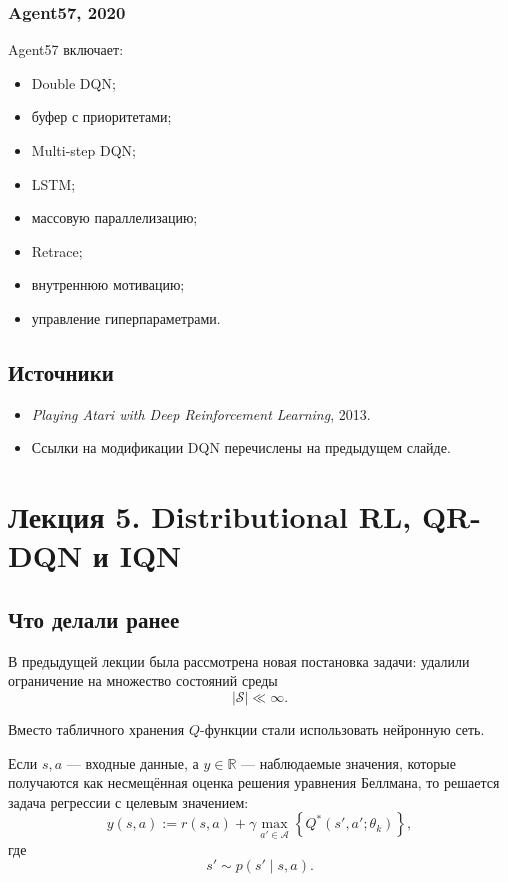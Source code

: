 \documentclass[12pt,a4paper]{article}
\begin{document}
\subsubsection{Agent57, 2020}

Agent57 включает:
\begin{itemize}
    \item Double DQN;
    \item буфер с приоритетами;
    \item Multi-step DQN;
    \item LSTM;
    \item массовую параллелизацию;
    \item Retrace;
    \item внутреннюю мотивацию;
    \item управление гиперпараметрами.
\end{itemize}

\subsection{Источники}

\begin{itemize}
    \item \textit{Playing Atari with Deep Reinforcement Learning}, 2013.
    \item Ссылки на модификации DQN перечислены на предыдущем слайде.
\end{itemize}


\section{Лекция 5. Distributional RL, QR-DQN и IQN}

\subsection{Что делали ранее}

В предыдущей лекции была рассмотрена новая постановка задачи: удалили ограничение на множество состояний среды
\[
|\mathcal S| \ll \infty.
\]

Вместо табличного хранения $Q$-функции стали использовать нейронную сеть.

Если $s,a$ --- входные данные, а $y \in \mathbb R$ --- наблюдаемые значения, которые получаются как несмещённая оценка решения уравнения Беллмана, то решается задача регрессии с целевым значением:
\[
y(s,a)
:=
r(s,a)
+
\gamma
\max_{a' \in \mathcal A}
\left\{
Q^\ast(s',a';\theta_k)
\right\},
\]
где
\[
s' \sim p(s'\mid s,a).
\]
\end{document}
